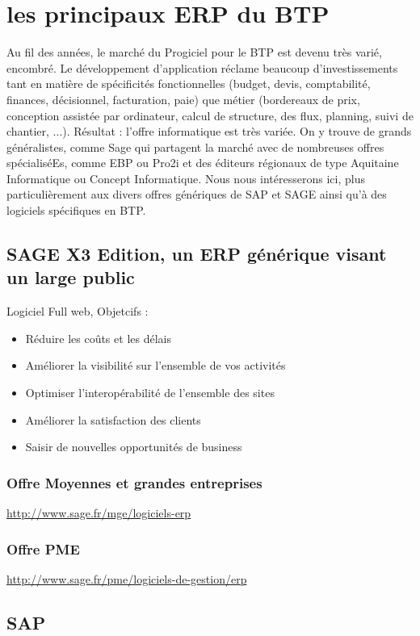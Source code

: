 \section{les principaux ERP du BTP}
Au fil des années, le marché du Progiciel pour le BTP est devenu très varié, encombré. 
Le développement d'application réclame beaucoup d'investissements tant en matière de spécificités fonctionnelles (budget, devis, comptabilité, finances, décisionnel, facturation, paie) que métier (bordereaux de prix, conception assistée par ordinateur, calcul de structure, des flux, planning, suivi de chantier, ...). 
Résultat : l'offre informatique est très variée. On y trouve de grands généralistes, comme Sage qui partagent la marché avec de nombreuses offres spécialiséEs, comme EBP ou Pro2i et des éditeurs régionaux de type Aquitaine Informatique ou Concept Informatique.
Nous nous intéresserons ici, plus particulièrement aux divers offres génériques de SAP et SAGE ainsi qu'à des logiciels spécifiques en BTP.
\subsection{SAGE X3 Edition, un ERP générique visant un large public}
Logiciel Full web,
Objetcifs :
\begin{itemize}
    \item Réduire les coûts et les délais
    \item Améliorer la visibilité sur l'ensemble de vos activités
	\item Optimiser l'interopérabilité de l'ensemble des sites
    \item Améliorer la satisfaction des clients
	\item Saisir de nouvelles opportunités de business
\end{itemize}

\subsubsection{Offre Moyennes et grandes entreprises}
\url{http://www.sage.fr/mge/logiciels-erp}
\subsubsection{Offre PME}
\url{http://www.sage.fr/pme/logiciels-de-gestion/erp}

\subsection{SAP}

